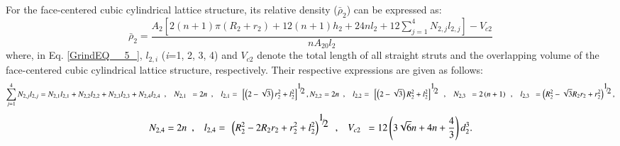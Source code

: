 \documentclass{article} %
\begin{document}
For the face-centered cubic cylindrical lattice structure, its relative density ($\bar{\rho }_{2} $) can be expressed as:
\begin{equation} \label{GrindEQ__5_} 
\bar{\rho }_{2} =\frac{A_{2} \left[2\left(n+1\right)\pi \left(R_{2} +r_{2} \right)+12\left(n+1\right)h_{2} +24nl_{2} +12\sum _{j=1}^{4}N_{2,j}  l_{2,j} \right]-V_{c2} }{nA_{20} l_{2} }  
\end{equation} 
where, in Eq. \eqref{GrindEQ__5_}, $l_{2,i} $ (\textit{i}=1, 2, 3, 4) and $V_{c2} $ denote the total length of all straight struts and the overlapping volume of the face-centered cubic cylindrical lattice structure, respectively. Their respective expressions are given as follows:
\[\sum _{j=1}^{4}N_{2,j}  l_{2,j} =N_{2,1} l_{2,1} +N_{2,2} l_{2,2} +N_{2,3} l_{2,3} +N_{2,4} l_{2,4} \begin{array}{cc} {,} & {N_{2,1} } \end{array}=2n\begin{array}{cc} {,} & {l_{2,1} =} \end{array}\left[\left(2-\sqrt{3} \right)r_{2}^{2} +l_{2}^{2} \right]^{{\raise0.7ex\hbox{$ 1 $}\!\mathord{\left/{\vphantom{1 2}}\right.\kern-\nulldelimiterspace}\!\lower0.7ex\hbox{$ 2 $}} } ,N_{2,2} =2n\begin{array}{cc} {,} & {l_{2,2} =} \end{array}\left[\left(2-\sqrt{3} \right)R_{2}^{2} +l_{2}^{2} \right]^{{\raise0.7ex\hbox{$ 1 $}\!\mathord{\left/{\vphantom{1 2}}\right.\kern-\nulldelimiterspace}\!\lower0.7ex\hbox{$ 2 $}} } \begin{array}{cc} {,} & {N_{2,3} } \end{array}=2\left(n+1\right)\begin{array}{cc} {,} & {l_{2,3} } \end{array}=\left(R_{2}^{2} -\sqrt{3} R_{2} r_{2} +r_{2}^{2} \right)^{{\raise0.7ex\hbox{$ 1 $}\!\mathord{\left/{\vphantom{1 2}}\right.\kern-\nulldelimiterspace}\!\lower0.7ex\hbox{$ 2 $}} } ,\] 
\[N_{2,4} =2n\begin{array}{cc} {,} & {l_{2,4} =} \end{array}\left(R_{2}^{2} -2R_{2} r_{2} +r_{2}^{2} +l_{2}^{2} \right)^{{\raise0.7ex\hbox{$ 1 $}\!\mathord{\left/{\vphantom{1 2}}\right.\kern-\nulldelimiterspace}\!\lower0.7ex\hbox{$ 2 $}} } \begin{array}{cc} {,} & {V_{c2} } \end{array}=12\left(3\sqrt{6} n+4n+\frac{4}{3} \right)d_{2}^{3} .\] 
\end{document}

